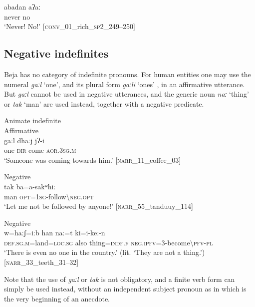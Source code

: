 \documentclass[output=paper,colorlinks,citecolor=brown]{langscibook}
\begin{document}
    \ex\label{ex:beja:32b}
        \gll abadan aʔaː\\
             never no\\
        \glt `Never! No!' [\textsc{conv}\_01\_rich\_\textsc{sp2}\_249–250]
    \z
\z 

\subsection{Negative indefinites}
\label{sec:beja:3.2}

Beja has no category of indefinite pronouns. For human entities one may use the numeral \textit{gaːl} ‘one’, and its plural form \textit{gaːli} ‘ones’ , in an affirmative utterance. But \textit{gaːl} cannot be used in negative utterances, and the generic noun \textit{naː} ‘thing’  or \textit{tak} ‘man’  are used instead, together with a negative predicate.

\ea\label{ex:beja:33}
{Animate indefinite}\\
    \ea\label{ex:beja:33a}
    {Affirmative}\\
        \gll gaːl dhaːj jʔ-i\\
             one \textsc{dir} come-\textsc{aor.3sg.m}\\
        \glt `Someone was coming towards him.' [\textsc{narr}\_11\_coffee\_03]
    
    \ex\label{ex:beja:33b}
    {Negative}\\
        \gll tak ba=a-sakʷhiː\\
             man \textsc{opt}=\textsc{1sg}{}-follow{\textbackslash}\textsc{neg.opt}\\
        \glt `Let me not be followed by anyone!' [\textsc{narr}\_55\_tanduuy\_114]
    
    \ex\label{ex:beja:33c}
    {Negative}\\
        \gll w=haːʃ=iːb han naː=t ki=i-keː-n\\
             \textsc{def.sg.m}=land=\textsc{loc.sg} also thing=\textsc{indf.f} \textsc{neg.ipfv=3}-become{\textbackslash}\textsc{pfv-pl}\\
         `There is even no one in the country.' (lit. `They are not a thing.') [\textsc{narr}\_33\_teeth\_31–32]
    \z
\z 

Note that the use of \textit{gaːl} or \textit{tak} is not obligatory, and a finite verb form can simply be used instead, without an independent subject pronoun as in  which is the very beginning of an anecdote.
\end{document}
